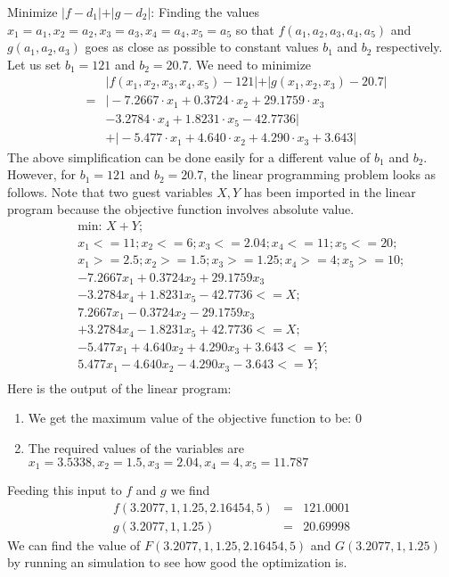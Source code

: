\documentclass[journal]{IEEEtran}
\begin{document}
Minimize $\vert f-d_1 \vert + \vert g-d_2 \vert$: Finding the values $x_1 = a_1,x_2 = a_2,x_3 = a_3,x_4 = a_4,x_5 = a_5$ so that $f(a_1,a_2,a_3,a_4,a_5)$ and $g(a_1,a_2,a_3)$  goes as close as possible to constant values $b_1$ and $b_2$ respectively. Let us set $b_1 = 121$ and $b_2 = 20.7$. We need to minimize
	\begin{eqnarray*}
		& &\vert f(x_1,x_2,x_3,x_4,x_5)-121 \vert + \vert g(x_1,x_2,x_3)-20.7 \vert \\ 
		& = &  \vert -7.2667 \cdot x_1 + 0.3724 \cdot x_2 + 29.1759 \cdot x_3 \\
		& &  - 3.2784 \cdot x_4 + 1.8231 \cdot x_5 - 42.7736 \vert \\
		& & + \vert -5.477 \cdot x_1 + 4.640 \cdot x_2 + 4.290 \cdot x_3 + 3.643 \vert
	\end{eqnarray*}
The above simplification can be done easily for a different value of $b_1$ and $b_2$. However, for $b_1=121$ and $b_2 = 20.7$, the linear programming problem looks as follows. Note that two guest variables $X,Y$ has been imported in the linear program because the objective function involves absolute value.
	\begin{eqnarray*}
		& & \text{min: } X + Y;\\
		& & x_1 <= 11; x_2 <= 6; x_3 <= 2.04; x_4 <= 11; x_5 <= 20; \\
		& & x_1 >= 2.5; x_2 >= 1.5; 	x_3 >= 1.25; x_4 >= 4; x_5 >= 10;\\
		& & -7.2667 x_1 + 0.3724 x_2 + 29.1759 x_3 \\
		& & - 3.2784 x_4 + 1.8231 x_5 - 42.7736 <= X;\\
		& & 7.2667 x_1 - 0.3724 x_2 - 29.1759 x_3 \\
		& & + 3.2784 x_4 - 1.8231 x_5 + 42.7736 <= X;\\
		& & -5.477 x_1 + 4.640 x_2 + 4.290 x_3 + 3.643 <= Y;\\
		& & 5.477 x_1 - 4.640 x_2 - 4.290 x_3 - 3.643 <= Y;\\
	\end{eqnarray*}
Here is the output of the linear program:
\begin{enumerate}
	\item We get the maximum value of the objective function to be: $0$
	\item The required values of the variables are $x_1 = 3.5338,x_2 = 1.5,x_3 = 2.04, x_4 = 4, x_5 = 11.787$
\end{enumerate}
Feeding this input to $f$ and $g$ we find
	\begin{eqnarray*}
		f(3.2077, 1, 1.25, 2.16454, 5) &=& 121.0001\\
		g(3.2077, 1, 1.25) &=& 20.69998
	\end{eqnarray*}
We can find the value of $F(3.2077, 1, 1.25, 2.16454, 5)$ and $G(3.2077, 1, 1.25)$ by running an simulation to see how good the optimization is.
\end{document}
